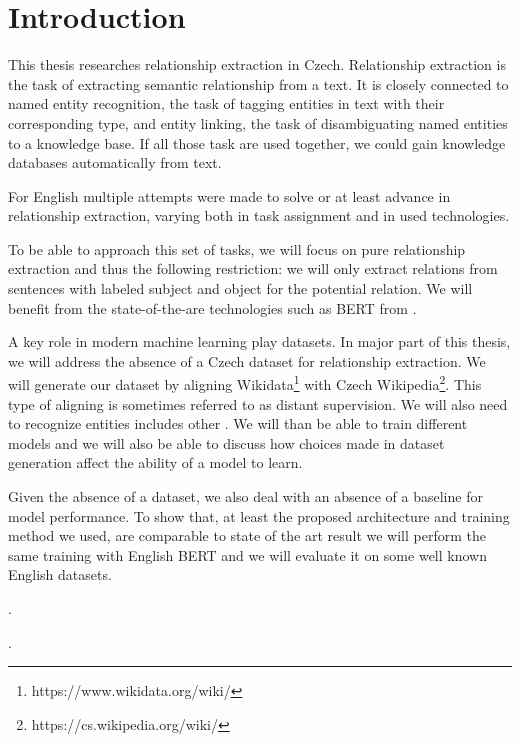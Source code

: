 \chapter*{Introduction}

This thesis researches relationship extraction in Czech. Relationship extraction is the task of extracting semantic relationship from a text. It is closely connected to named entity recognition, the task of tagging entities in text with their corresponding type, and entity linking, the task of disambiguating named entities to a knowledge base. If all those task are used together, we could gain knowledge databases automatically from text. 

For English multiple attempts were made to solve or at least advance in relationship extraction, varying both in task assignment and in used technologies. 

To be able to approach this set of tasks, we will focus on pure  relationship extraction and thus the following restriction: we will only extract relations from sentences with labeled subject and object for the potential relation. We will benefit from the state-of-the-are technologies such as BERT from \cite{devlin2018bert}.  

A key role in modern machine learning play datasets. In major part of this thesis, we will address the absence of a Czech dataset for relationship extraction. We will generate our dataset by aligning Wikidata\footnote{https://www.wikidata.org/wiki/} with Czech Wikipedia\footnote{https://cs.wikipedia.org/wiki/}. This type of aligning is sometimes referred to as distant supervision. We will also need to recognize entities includes other . We will than be able to train different models and we will also be able to discuss how choices made in dataset generation affect the ability of a model to learn.

Given the absence of a dataset, we also deal with an absence of a baseline for model performance. To show that, at least the proposed architecture and training method we used, are comparable to state of the art result we will perform the same training with English BERT and we will evaluate it on some well known English datasets. 

.

.





